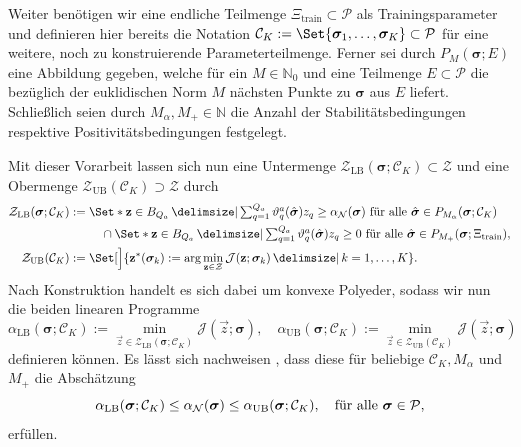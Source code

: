 \documentclass[../main.tex]{subfiles}
\begin{document}
Weiter benötigen wir eine endliche Teilmenge $\Xi_{\mathrm{train}} \subset \mathcal P$ als Trainingsparameter und definieren hier bereits die Notation $\mathcal C_{K} := \Set{ \bm \sigma_{1}, \dots, \bm \sigma_{K} } \subset \mathcal P$ für eine weitere, noch zu konstruierende Parameterteilmenge.
Ferner sei durch $P_{M}(\bm \sigma; E)$ eine Abbildung gegeben, welche für ein $M \in \mathbb{N}_{0}$ und eine Teilmenge $E \subset \mathcal P$ die bezüglich der euklidischen Norm $M$ nächsten Punkte zu $\bm \sigma$ aus $E$ liefert.
Schließlich seien durch $M_{\alpha}, M_{+} \in \mathbb{N}$ die Anzahl der Stabilitätsbedingungen respektive Positivitätsbedingungen festgelegt.

Mit dieser Vorarbeit lassen sich nun eine Untermenge $\mathcal Z_{\mathrm{LB}}(\bm \sigma; \mathcal C_{K}) \subset \mathcal Z$ und eine Obermenge $\mathcal Z_{\mathrm{UB}}(\mathcal C_{K}) \supset \mathcal Z$ durch
\begin{equation}
    \begin{aligned}
        \mathcal Z_{\mathrm{LB}}(\bm \sigma; \mathcal C_{K}) &:=
        \begin{multlined}[t]
        \Set*{\vec{z} \in B_{Q_a} \given
        \textstyle\sum_{q = 1}^{Q_a} \theta_{q}^{a}(\hat{\bm \sigma})z_{q} \geq \alpha_{\mathcal N}(\bm \sigma)~\fa \hat{\bm \sigma} \in P_{M_{\alpha}}(\bm \sigma; \mathcal C_{K})
        }
        \\ \cap
        \Set*{\vec{z} \in B_{Q_a} \given
        \textstyle\sum_{q = 1}^{Q_a} \theta_{q}^{a}(\hat{\bm \sigma}) z_{q} \geq 0~\fa \hat{\bm \sigma} \in P_{M_{+}}(\bm \sigma; \Xi_{\mathrm{train}})
        },
        \end{multlined}\\
        \mathcal Z_{\mathrm{UB}}(\mathcal C_{K}) &:= \Set[\Big]{ \vec{z}^{*}(\bm \sigma_{k}) := \arg \min_{\vec z \in \mathcal Z} \mathcal J(\vec{z}; \bm \sigma_{k}) \given k = 1, \dots, K}.
    \end{aligned}
\end{equation}
Nach Konstruktion handelt es sich dabei um konvexe Polyeder, sodass wir nun die beiden linearen Programme
\begin{equation}
    \alpha_{\mathrm{LB}}(\bm \sigma; \mathcal C_{K}) := \min_{\vec{z} \in \mathcal Z_{\mathrm{LB}}(\bm \sigma; \mathcal C_{K})} \mathcal J(\vec{z}; \bm \sigma),
    \quad
    \alpha_{\mathrm{UB}}(\bm \sigma; \mathcal C_{K}) := \min_{\vec{z} \in \mathcal Z_{\mathrm{UB}}(\mathcal C_{K})} \mathcal J(\vec{z}; \bm \sigma)
\end{equation}
definieren können.
Es lässt sich nachweisen \cite[Proposition 1]{Huynh2007}, dass diese für beliebige $\mathcal C_{K}, M_{\alpha}$ und $M_{+}$ die Abschätzung
\begin{equation}
    \alpha_{\mathrm{LB}}(\bm \sigma; \mathcal C_{K}) \leq \alpha_{\mathcal N}(\bm \sigma) \leq \alpha_{\mathrm{UB}}(\bm \sigma; \mathcal C_{K}), \quad \fa \bm \sigma \in \mathcal P,
\end{equation}
erfüllen.
\end{document}

